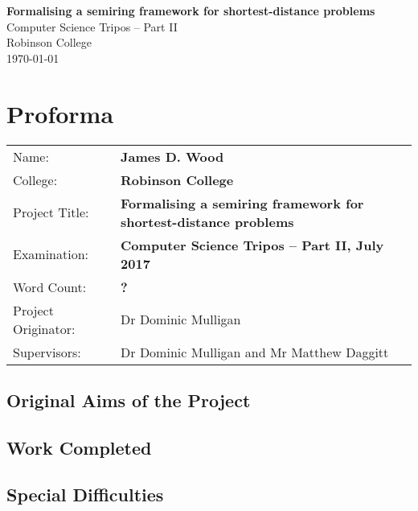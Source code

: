 \documentclass[12pt,a4paper,twoside,openright]{report}
\newcommand{\mytitle}{Formalising a semiring framework for shortest-distance problems}
\begin{document}


\pagestyle{empty}


\vspace*{60mm}
\begin{center}
\Huge
\textbf{\mytitle} \\[5mm]
Computer Science Tripos -- Part II \\[5mm]
Robinson College \\[5mm]
\today  %
\end{center}


\pagestyle{plain}

\chapter*{Proforma}

{\large
\begin{tabularx}{\linewidth}{lX}
Name:               & \bf James D. Wood \\
College:            & \bf Robinson College \\
Project Title:      & \bf \mytitle \\
Examination:        & \bf Computer Science Tripos -- Part II, July 2017  \\
Word Count:         & \bf ? \\
Project Originator: & Dr Dominic Mulligan \\
Supervisors:        & Dr Dominic Mulligan and Mr Matthew Daggitt \\
\end{tabularx}
}


\section*{Original Aims of the Project}

\section*{Work Completed}

\section*{Special Difficulties}
\end{document}
